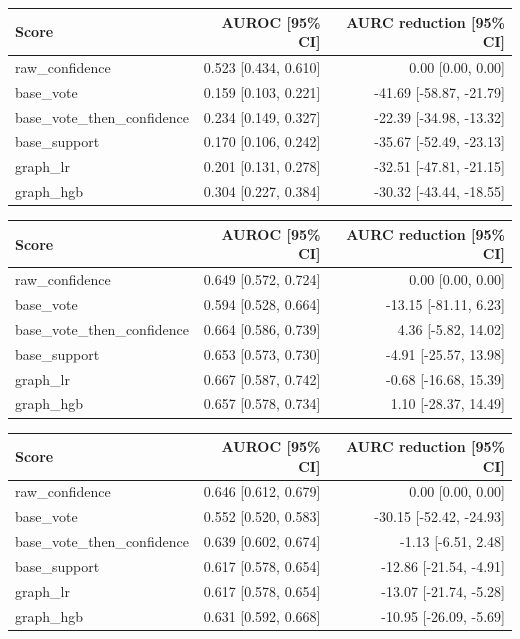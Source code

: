 \begin{tabular}{lrr}
\hline
Score & AUROC [95\% CI] & AURC reduction [95\% CI] \\
\hline
raw\_confidence & 0.523 [0.434, 0.610] & 0.00 [0.00, 0.00] \\
base\_vote & 0.159 [0.103, 0.221] & -41.69 [-58.87, -21.79] \\
base\_vote\_then\_confidence & 0.234 [0.149, 0.327] & -22.39 [-34.98, -13.32] \\
base\_support & 0.170 [0.106, 0.242] & -35.67 [-52.49, -23.13] \\
graph\_lr & 0.201 [0.131, 0.278] & -32.51 [-47.81, -21.15] \\
graph\_hgb & 0.304 [0.227, 0.384] & -30.32 [-43.44, -18.55] \\
\hline
\end{tabular}

\begin{tabular}{lrr}
\hline
Score & AUROC [95\% CI] & AURC reduction [95\% CI] \\
\hline
raw\_confidence & 0.649 [0.572, 0.724] & 0.00 [0.00, 0.00] \\
base\_vote & 0.594 [0.528, 0.664] & -13.15 [-81.11, 6.23] \\
base\_vote\_then\_confidence & 0.664 [0.586, 0.739] & 4.36 [-5.82, 14.02] \\
base\_support & 0.653 [0.573, 0.730] & -4.91 [-25.57, 13.98] \\
graph\_lr & 0.667 [0.587, 0.742] & -0.68 [-16.68, 15.39] \\
graph\_hgb & 0.657 [0.578, 0.734] & 1.10 [-28.37, 14.49] \\
\hline
\end{tabular}

\begin{tabular}{lrr}
\hline
Score & AUROC [95\% CI] & AURC reduction [95\% CI] \\
\hline
raw\_confidence & 0.646 [0.612, 0.679] & 0.00 [0.00, 0.00] \\
base\_vote & 0.552 [0.520, 0.583] & -30.15 [-52.42, -24.93] \\
base\_vote\_then\_confidence & 0.639 [0.602, 0.674] & -1.13 [-6.51, 2.48] \\
base\_support & 0.617 [0.578, 0.654] & -12.86 [-21.54, -4.91] \\
graph\_lr & 0.617 [0.578, 0.654] & -13.07 [-21.74, -5.28] \\
graph\_hgb & 0.631 [0.592, 0.668] & -10.95 [-26.09, -5.69] \\
\hline
\end{tabular}

